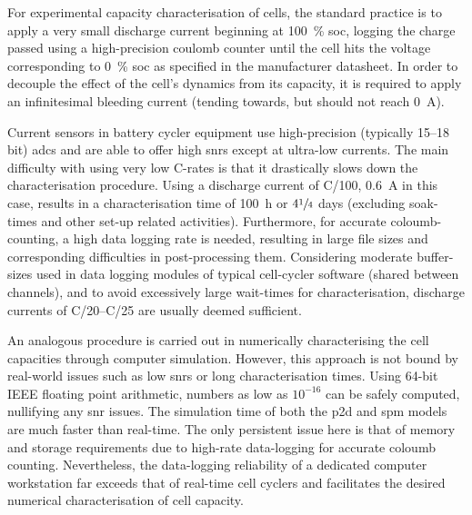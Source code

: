 For experimental capacity characterisation of cells, the standard practice is to
apply a very small discharge  current beginning at \SI{100}{\percent} \gls{soc},
logging the charge passed using a  high-precision coulomb counter until the cell
hits the voltage corresponding to \SI{0}{\percent} \gls{soc} as specified in the
manufacturer datasheet. In  order to decouple the effect of  the cell's dynamics
from its  capacity, it is  required to  apply an infinitesimal  bleeding current
(tending towards, but should not reach \SI{0}{\ampere}).

Current sensors in battery cycler equipment use high-precision (typically 15--18
bit) \glspl{adc}  and are  able to  offer high  \glspl{snr} except  at ultra-low
currents. The main difficulty with using very low C-rates is that it drastically
slows down the  characterisation procedure. Using a discharge  current of C/100,
\ie{}  \SI{0.6}{\ampere} in  this case,  results in  a characterisation  time of
\SI{100}{\hour} or \approx $4\sfrac{1}{4}$  days (excluding soak-times and other
set-up related  activities). Furthermore, for accurate  coloumb-counting, a high
data logging  rate is needed,  resulting in  large file sizes  and corresponding
difficulties in post-processing them.  Considering moderate buffer-sizes used in
data logging modules of typical  cell-cycler software (shared between channels),
and  to  avoid  excessively  large wait-times  for  characterisation,  discharge
currents of C/20--C/25 are usually deemed sufficient.

An analogous  procedure is  carried out in  numerically characterising  the cell
capacities through computer  simulation. However, this approach is  not bound by
real-world issues such as low  \glspl{snr} or long characterisation times. Using
64-bit IEEE  floating point arithmetic,  numbers as low  as $\mathcal{10^{-16}}$
can be safely computed, nullifying any  \gls{snr} issues. The simulation time of
both the  \gls{p2d} and  \gls{spm} models  are much  faster than  real-time. The
only  persistent issue  here  is that  of memory  and  storage requirements  due
to  high-rate  data-logging for  accurate  coloumb  counting. Nevertheless,  the
data-logging reliability of a dedicated computer workstation far exceeds that of
real-time cell cyclers and facilitates the desired numerical characterisation of
cell capacity.

